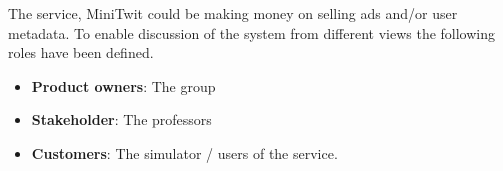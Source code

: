 The service, MiniTwit could be making money on selling ads and/or user metadata. To enable discussion of the system from different views the following roles have been defined.

\begin{itemize}
    \item \textbf{Product owners}: The group
    \item \textbf{Stakeholder}: The professors
    \item \textbf{Customers}: The simulator / users of the service.
\end{itemize}

